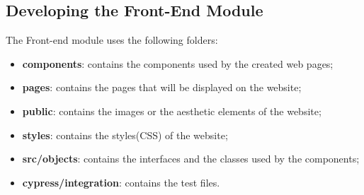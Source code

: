 \subsection{Developing the Front-End Module}
The Front-end module uses the following folders:
\begin{itemize}
\item \textbf{components}: contains the components used by the created web pages;
\item \textbf{pages}: contains the pages that will be displayed on the website;
\item \textbf{public}: contains the images or the aesthetic elements of the website;
\item \textbf{styles}: contains the styles(CSS) of the website;
\item \textbf{src/objects}: contains the interfaces and the classes used by the components;
\item \textbf{cypress/integration}: contains the test files. 
\end{itemize}